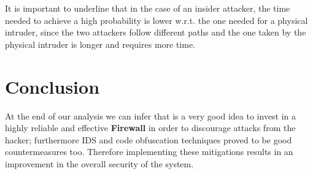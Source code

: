 It is important to underline that in the case of an insider attacker, the time needed to achieve a high probability is lower w.r.t. the one needed for a physical intruder, since the two attackers follow different paths and the one taken by the physical intruder is longer and requires more time.

\section{Conclusion}
\noindent At the end of our analysis we can infer that is a very good idea to invest in a highly reliable and effective \textbf{Firewall} in order to discourage attacks from the hacker; furthermore IDS and code obfuscation techniques proved to be good countermeasures too.
Therefore implementing these mitigations results in an improvement in the overall security of the system.
